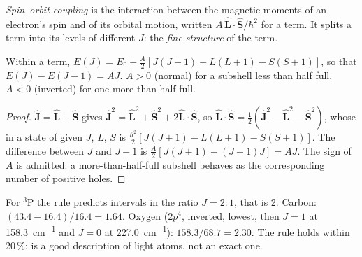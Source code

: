 \begin{definition}\label{def:b3:many-electron-atoms:spin-orbit}
\emph{Spin--orbit coupling} is the interaction
between the magnetic moments of an electron's spin and of its orbital
motion, written $A\,\hat{\mathbf L}\cdot\hat{\mathbf S}/\hbar^2$ for a term. It
splits a term into its levels of different $J$: the \emph{fine
structure} of the term.
\end{definition}

\begin{proposition}\label{prop:b3:many-electron-atoms:lande}
Within a term, $E(J) = E_0 + \frac{A}{2}[J(J+1) - L(L+1) - S(S+1)]$, so that
$E(J) - E(J - 1) = AJ$. $A > 0$ (normal) for a subshell less than half full,
$A < 0$ (inverted) for one more than half full.
\end{proposition}

\begin{proof}
$\hat{\mathbf J} = \hat{\mathbf L} + \hat{\mathbf S}$ gives $\hat{\mathbf J}^2 =
\hat{\mathbf L}^2 + \hat{\mathbf S}^2 + 2\hat{\mathbf L}\cdot\hat{\mathbf S}$, so
$\hat{\mathbf L}\cdot\hat{\mathbf S} = \frac12(\hat{\mathbf J}^2 - \hat{\mathbf L}^2 -
\hat{\mathbf S}^2)$, whose  in a state of given $J$, $L$, $S$ is
$\frac{\hbar^2}{2}[J(J+1) - L(L+1) - S(S+1)]$. The difference between $J$ and
$J - 1$ is $\frac A2[J(J+1) - (J-1)J] = AJ$. The sign of $A$ is admitted: a
more-than-half-full subshell behaves as the corresponding number of positive
holes.
\end{proof}

\begin{example}\label{ex:b3:many-electron-atoms:lande-test}
For ${}^3$P the rule predicts intervals in the ratio $J = 2 : 1$, that is 2.
Carbon: $(43.4 - 16.4)/16.4 = 1.64$. Oxygen ($2p^4$, inverted, 
lowest, then $J = 1$ at \qty{158.3}{cm^{-1}} and $J = 0$ at \qty{227.0}{cm^{-1}}):
$158.3/68.7 = 2.30$. The rule holds within 20\,\%: 
is a good description of light atoms, not an exact one.
\end{example}

